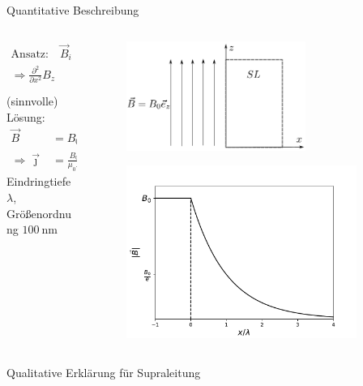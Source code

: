 \begin{frame}{Quantitative Beschreibung}

\begin{columns}
\begin{column}{0.49\textwidth}
\begin{align*}
    \text{Ansatz:} \quad \vec{B}_i &= (0, 0, B_z(x))^T \\
  \Rightarrow \frac{\partial ^2}{\partial x^2}B_z &= \frac{1}{\lambda ^2}B_z, \quad \lambda = \sqrt{\frac{m}{\mu_0 n q^2}}
\end{align*}
(sinnvolle) Lösung:
\begin{align*}
   \vec{B} &= B_0 \exp\left[-\frac{x}{\lambda}\right]\vec{e}_z \\
   \Rightarrow \vec{\jmath} &= \frac{B_0}{\mu_0 \lambda}\exp \left[-\frac{x}{\lambda} \right] \vec{e}_y
\end{align*}
Eindringtiefe $\lambda$, Größenordnung $\SI{100}{\nano\meter}$
\end{column}
\begin{column}{0.49\textwidth}
  \begin{figure}
    \centering
    \includegraphics[width = 0.7\textwidth]{bilder/supra_3.pdf}
    \label{fig: londongleichungen}
  \end{figure}
  \pause
  \begin{figure}
    \centering
    \includegraphics[width = 0.9\textwidth]{bilder/plot_london.pdf}
    \label{fig: plot_londongleichungen}
  \end{figure}
\end{column}
\end{columns}

\end{frame}


\begin{frame}{Qualitative Erklärung für Supraleitung}



\end{frame}

